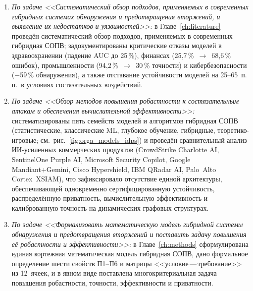 \begin{enumerate}[leftmargin=2em, itemsep=0pt]

\item \textit{По задаче <<Систематический обзор подходов,
применяемых в современных гибридных системах обнаружения и
предотвращения вторжений, и выявление их недостатков и
уязвимостей>>:} в Главе~\ref{ch:literature} проведён
систематический обзор подходов, применяемых в современных
гибридная СОПВ; задокументированы критические отказы моделей в
здравоохранении (падение AUC до 25\,\%), финансах
(25{,}7\,\%~$\to$~68{,}6\,\% ошибок), промышленности
(94{,}2\,\%~$\to$~30\,\% точности) и кибербезопасности
($-$59\,\% обнаружения), а также отставание устойчивости
моделей на 25--65~п.\,п.\ в условиях состязательных воздействий.

\item \textit{По задаче <<Обзор методов повышения робастности к
состязательным атакам и обеспечения вычислительной
эффективности>>:} систематизированы пять семейств моделей и
алгоритмов гибридная СОПВ (статистические, классические ML,
глубокое обучение, гибридные, теоретико-игровые;
см.~рис.~\ref{fig:orga_models_idps}) и проведён сравнительный
анализ ИИ-усиленных коммерческих продуктов (CrowdStrike Charlotte
AI, SentinelOne Purple AI, Microsoft Security Copilot, Google
Mandiant+Gemini, Cisco Hypershield, IBM QRadar AI, Palo~Alto
Cortex~XSIAM), что зафиксировало отсутствие единой архитектуры,
обеспечивающей одновременно сертифицированную устойчивость,
распределённую приватность, вычислительную эффективность и
калиброванную точность на динамических графовых структурах.

\item \textit{По задаче <<Формализовать математическую модель
гибридной системы обнаружения и предотвращения вторжений и
поставить задачу повышения её робастности и эффективности>>:}
в Главе~\ref{ch:methods} сформулирована единая кортежная
математическая модель гибридная СОПВ, дано формальное определение
шести свойств П1--П6 и матрицы <<условие\,---\,требование>> из
12~ячеек, и в явном виде поставлена многокритериальная задача
повышения робастности, точности, эффективности и приватности.


\end{enumerate}
